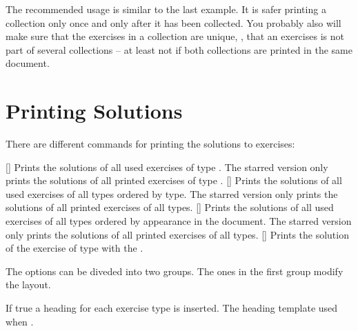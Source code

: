 \documentclass{xsim-manual}
\begin{document}
\begin{bewareofthedog}
  The recommended usage is similar to the last example.  It is safer printing
  a collection only once and only after it has been collected.  You probably
  also will make sure that the exercises in a collection are unique, \ie, that
  an exercises is not part of several collections -- at least not if both
  collections are printed in the same document.
\end{bewareofthedog}

\section{Printing Solutions}\label{sec:printing-solutions}

There are different commands for printing the solutions to exercises:
\begin{commands}
  [\sarg{}]
    Prints the solutions of all used exercises of type .
    The starred version only prints the solutions of all printed exercises of
    type .
  [\sarg{}]
    Prints the solutions of all used exercises of all types ordered by type.
    The starred version only prints the solutions of all printed exercises of
    all types.
  [\sarg{}]
    Prints the solutions of all used exercises of all types ordered by
    appearance in the document.  The starred version only prints the solutions
    of all printed exercises of all types.
  []
    Prints the solution of the exercise of type  with the
     .
\end{commands}

\begin{example}
\end{example}

The options can be diveded into two groups.  The ones in the first group
modify the layout.
\begin{options}
    If true a heading for each exercise type is inserted.
    The heading template used when .
\end{options}
\end{document}
